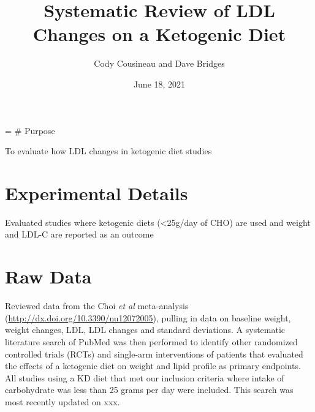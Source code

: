 \documentclass[
]{article}
\title{Systematic Review of LDL Changes on a Ketogenic Diet}
\author{Cody Cousineau and Dave Bridges}
\date{June 18, 2021}
\begin{document}
\maketitle

{
\setcounter{tocdepth}{2}
\tableofcontents
}
= \# Purpose

To evaluate how LDL changes in ketogenic diet studies

\hypertarget{experimental-details}{%
\section{Experimental Details}\label{experimental-details}}

Evaluated studies where ketogenic diets (\textless25g/day of CHO) are
used and weight and LDL-C are reported as an outcome

\hypertarget{raw-data}{%
\section{Raw Data}\label{raw-data}}

Reviewed data from the Choi \emph{et al} meta-analysis
(\url{http://dx.doi.org/10.3390/nu12072005}), pulling in data on
baseline weight, weight changes, LDL, LDL changes and standard
deviations. A systematic literature search of PubMed was then performed
to identify other randomized controlled trials (RCTs) and single-arm
interventions of patients that evaluated the effects of a ketogenic diet
on weight and lipid profile as primary endpoints. All studies using a KD
diet that met our inclusion criteria where intake of carbohydrate was
less than 25 grams per day were included. This search was most recently
updated on xxx.
\end{document}
